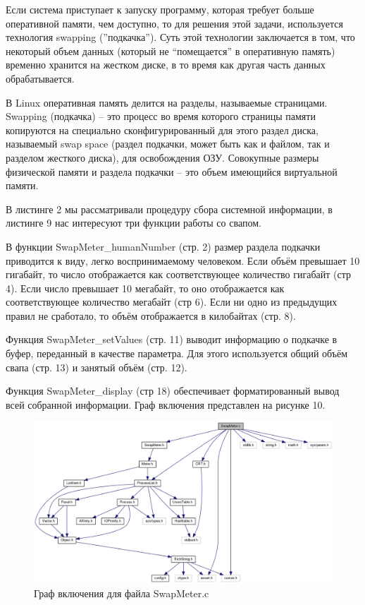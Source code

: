 \documentclass[a4paper, 12pt]{article}		%
\begin{document}
Если система приступает к запуску программу, которая требует больше оперативной памяти, чем доступно, то для решения этой задачи, используется технология swapping (”подкачка”). Суть этой технологии заключается в том, что некоторый объем данных (который не “помещается” в оперативную память) временно хранится на жестком диске, в то время как другая часть данных обрабатывается.

В Linux оперативная память делится на разделы, называемые страницами. Swapping (подкачка) – это процесс во время которого страницы памяти копируются на специально сконфигурированный для этого раздел диска, называемый swap space (раздел подкачки, может быть как и файлом, так и разделом жесткого диска), для освобождения ОЗУ. Совокупные размеры физической памяти и раздела подкачки – это объем имеющийся виртуальной памяти.

В листинге 2 мы рассматривали процедуру сбора системной информации, в листинге 9 нас интересуют три функции работы со свапом.

В функции SwapMeter\_humanNumber (стр. 2) размер раздела подкачки приводится к виду, легко воспринимаемому человеком. Если объём превышает 10 гигабайт, то число отображается как соответствующее количество гигабайт (стр 4). Если число превышает 10 мегабайт, то оно отображается как соответствующее количество мегабайт (стр 6). Если ни одно из предыдущих правил не сработало, то объём отображается в килобайтах (стр. 8).

Функция SwapMeter\_setValues (стр. 11) выводит информацию о подкачке в буфер, переданный в качестве параметра. Для этого используется общий объём свапа (стр. 13) и занятый объём (стр. 12).

Функция SwapMeter\_display (стр 18) обеспечивает форматированный вывод всей собранной информации. Граф включения представлен на рисунке 10.



\begin{figure}[h!]
\centering
\includegraphics[scale=0.43]{res/swap_meter.png}
\caption{Граф включения для файла SwapMeter.c}
\end{figure}
\end{document}
